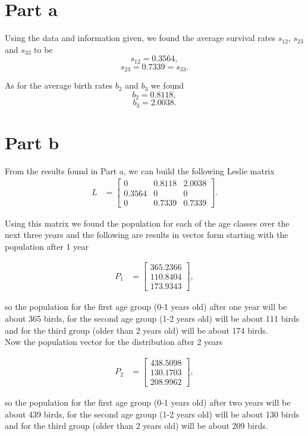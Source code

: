 \section{Part a}
Using the data and information given, we found the average survival rates $s_{12}$, $s_{23}$ and $s_{33}$ to be
$$
s_{12} = 0.3564,
$$
$$
s_{23} = 0.7339 = s_{33}.
$$

As for the average birth rates $b_{2}$ and $b_{3}$ we found
$$
b_{2} = 0.8118,
$$
$$
b_{3} = 2.0038.
$$

\section{Part b}
From the results found in Part a, we can build the following Leslie matrix
\begin{align}
L  &= \begin{bmatrix}
0 & 0.8118 & 2.0038\\
0.3564 & 0 & 0\\
0 & 0.7339 & 0.7339
\end{bmatrix}.
\end{align}

Using this matrix we found the population for each of the age classes over the next three years and the following are results in vector form starting with the population after 1 year

\begin{align}
\textbf{$P_{1}$} &= \begin{bmatrix}
365.2366\\
110.8404\\
173.9343
\end{bmatrix},
\end{align}

so the population for the first age group (0-1 years old) after one year will be about 365 birds, for the second age group (1-2 years old) will be about 111 birds and for the third group (older than 2 years old) will be about 174 birds.\\
Now the population vector for the distribution after 2 years

\begin{align}
\textbf{$P_{2}$} &= \begin{bmatrix}
438.5098\\
130.1703\\
208.9962
\end{bmatrix},
\end{align}

so the population for the first age group (0-1 years old) after two years will be about 439 birds, for the second age group (1-2 years old) will be about 130 birds and for the third group (older than 2 years old) will be about 209 birds.\\

